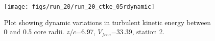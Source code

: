 \begin{figure}[H]
\centering
\texttt{[image: figs/run\_20/run\_20\_ctke\_05rdynamic]}
\caption{Plot showing dynamic variations in turbulent kinetic energy between 0 and 0.5 core radii. $z/c$=6.97, $V_{free}$=33.39, station 2.}
\label{fig:run_20_ctke_05rdynamic}
\end{figure}


